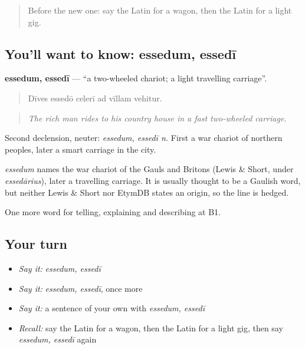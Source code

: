 \begin{quote}
Before the new one: say the Latin for a wagon, then the Latin for a light gig.
\end{quote}

\subsection*{You'll want to know: essedum, essedī}
\textbf{essedum, essedī} — \textquotedblleft{}a two-wheeled chariot; a light travelling carriage\textquotedblright{}.

\begin{quote}
Dīves essedō celerī ad vīllam vehitur.
\end{quote}

\begin{quote}
\emph{The rich man rides to his country house in a fast two-wheeled carriage.}
\end{quote}

Second declension, neuter: \emph{essedum, essedī n.} First a war chariot of northern peoples, later a smart carriage in the city.

\begin{cousinweb}
\emph{essedum} names the war chariot of the Gauls and Britons (Lewis \& Short, under \emph{essedārius}), later a travelling carriage. It is usually thought to be a Gaulish word, but neither Lewis \& Short nor EtymDB states an origin, so the line is hedged.
\end{cousinweb}

\begin{grammarlens}[title={What you've built}]
One more word for telling, explaining and describing at B1.
\end{grammarlens}

\subsection*{Your turn}
\begin{itemize}
\raggedright
  \item \emph{Say it:} \emph{essedum, essedī}
  \item \emph{Say it:} \emph{essedum, essedī}, once more
  \item \emph{Say it:} a sentence of your own with \emph{essedum, essedī}
  \item \emph{Recall:} say the Latin for a wagon, then the Latin for a light gig, then say \emph{essedum, essedī} again
\end{itemize}

